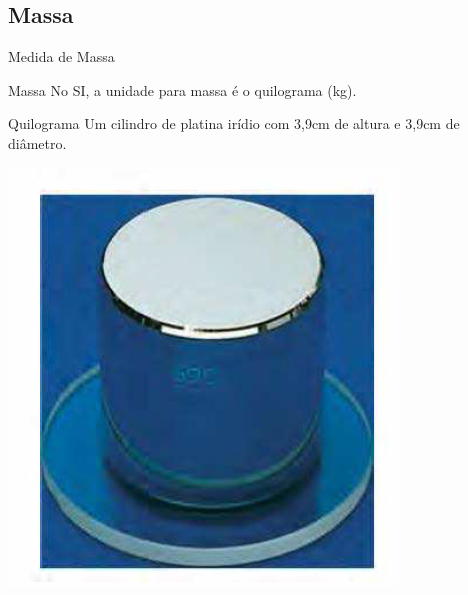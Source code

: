 \documentclass[xcolor=dvipsnames,table]{beamer}
\begin{document}
	\subsection{Massa}
	\begin{frame}{Medida de Massa}
		\begin{block}{Massa}
			No SI, a unidade para massa é o quilograma (kg).
		\end{block} \pause
		\begin{block}{Quilograma}
			Um cilindro de platina irídio com 3,9cm de altura e 3,9cm de diâmetro.
		\end{block} \pause
		\begin{center}
			\includegraphics[scale=0.3]{images/figura1-3.png}
		\end{center}
	\end{frame}
	
\end{document}
